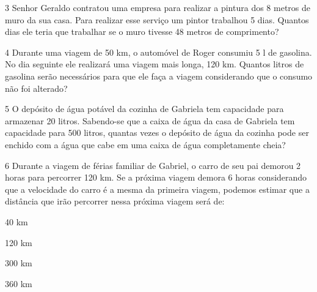 \num{3} Senhor Geraldo contratou uma empresa para realizar a pintura dos 8
metros de muro da sua casa. Para realizar esse serviço um pintor
trabalhou 5 dias. Quantos dias ele teria que trabalhar se o muro tivesse
48 metros de comprimento?



\num{4} Durante uma viagem de 50 km, o automóvel de Roger consumiu 5 l de
gasolina. No dia seguinte ele realizará uma viagem mais longa, 120 km.
Quantos litros de gasolina serão necessários para que ele faça a viagem
considerando que o consumo não foi alterado?



\num{5} O depósito de água potável da cozinha de Gabriela tem capacidade
para armazenar 20 litros. Sabendo-se que a caixa de água da casa de
Gabriela tem capacidade para 500 litros, quantas vezes o depósito de
água da cozinha pode ser enchido com a água que cabe em uma caixa de
água completamente cheia?



\num{6} Durante a viagem de férias familiar de Gabriel, o carro de seu pai
demorou 2 horas para percorrer 120 km. Se a próxima viagem demora 6
horas considerando que a velocidade do carro é a mesma da primeira
viagem, podemos estimar que a distância que irão percorrer nessa próxima
viagem será de:

\begin{escolha}
\item
  40 km
\item
  120 km
\item
  300 km
\item
  360 km
\end{escolha}

